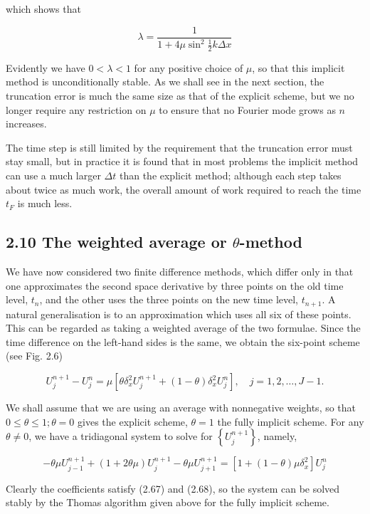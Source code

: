 \documentclass[10pt]{article}
\begin{document}
which shows that

\[
\lambda=\frac{1}{1+4 \mu \sin ^{2} \frac{1}{2} k \Delta x}
\]

Evidently we have \(0<\lambda<1\) for any positive choice of \(\mu\), so that this implicit method is unconditionally stable. As we shall see in the next section, the truncation error is much the same size as that of the explicit scheme, but we no longer require any restriction on \(\mu\) to ensure that no Fourier mode grows as \(n\) increases.

The time step is still limited by the requirement that the truncation error must stay small, but in practice it is found that in most problems the implicit method can use a much larger \(\Delta t\) than the explicit method; although each step takes about twice as much work, the overall amount of work required to reach the time \(t_{F}\) is much less.

\subsection*{2.10 The weighted average or \(\theta\)-method}
We have now considered two finite difference methods, which differ only in that one approximates the second space derivative by three points on the old time level, \(t_{n}\), and the other uses the three points on the new time level, \(t_{n+1}\). A natural generalisation is to an approximation which uses all six of these points. This can be regarded as taking a weighted average of the two formulae. Since the time difference on the left-hand sides is the same, we obtain the six-point scheme (see Fig. 2.6)

\[
U_{j}^{n+1}-U_{j}^{n}=\mu\left[\theta \delta_{x}^{2} U_{j}^{n+1}+(1-\theta) \delta_{x}^{2} U_{j}^{n}\right], \quad j=1,2, \ldots, J-1 .
\]

We shall assume that we are using an average with nonnegative weights, so that \(0 \leq \theta \leq 1 ; \theta=0\) gives the explicit scheme, \(\theta=1\) the fully implicit scheme. For any \(\theta \neq 0\), we have a tridiagonal system to solve for \(\left\{U_{j}^{n+1}\right\}\), namely,

\[
-\theta \mu U_{j-1}^{n+1}+(1+2 \theta \mu) U_{j}^{n+1}-\theta \mu U_{j+1}^{n+1}=\left[1+(1-\theta) \mu \delta_{x}^{2}\right] U_{j}^{n}
\]

Clearly the coefficients satisfy (2.67) and (2.68), so the system can be solved stably by the Thomas algorithm given above for the fully implicit scheme.
\end{document}

